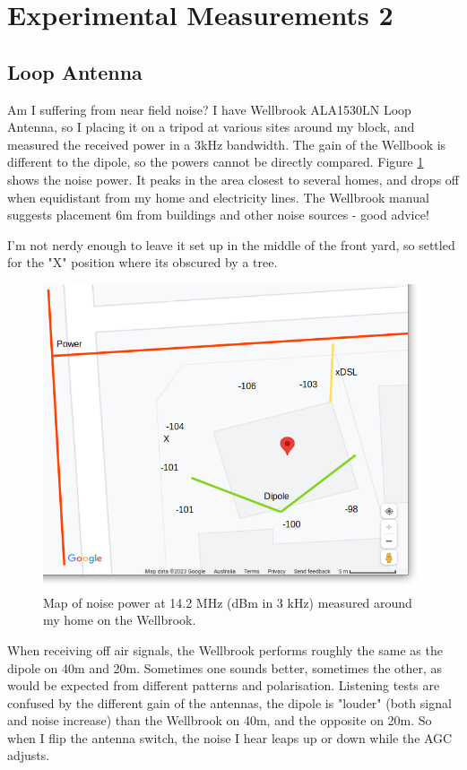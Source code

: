 \documentclass{article}
\begin{document}
\section{Experimental Measurements 2}

\subsection{Loop Antenna}

Am I suffering from near field noise? I have Wellbrook ALA1530LN Loop Antenna, so I placing it on a tripod at various sites around my block, and measured the received power in a 3kHz bandwidth. The gain of the Wellbook is different to the dipole, so the powers cannot be directly compared.  Figure \ref{fig:home_map_loop} shows the noise power.  It peaks in the area closest to several homes, and drops off when equidistant from my home and electricity lines.  The Wellbrook manual suggests placement 6m from buildings and other noise sources - good advice!

I'm not nerdy enough to leave it set up in the middle of the front yard, so settled for the "X" position where its obscured by a tree.

\begin{figure}[h]
\caption{Map of noise power at 14.2 MHz (dBm in 3 kHz) measured around my home on the Wellbrook.}
\label{fig:home_map_loop}
\begin{center}
\includegraphics[width=12cm]{house_map_loop.png}
\end{center}
\end{figure}

When receiving off air signals, the Wellbrook performs roughly the same as the dipole on 40m and 20m.  Sometimes one sounds better, sometimes the other, as would be expected from different patterns and polarisation.  Listening tests are confused by the different gain of the antennas, the dipole is "louder" (both signal and noise increase) than the Wellbrook on 40m, and the opposite on 20m.  So when I flip the antenna switch, the noise I hear leaps up or down while the AGC adjusts.
\end{document}
